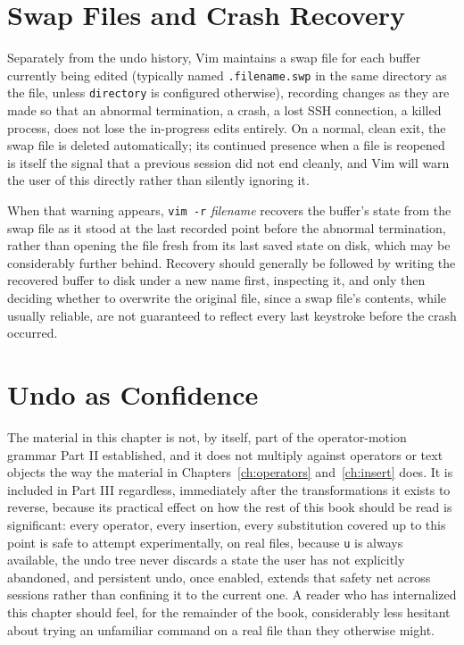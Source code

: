 \section{Swap Files and Crash Recovery}

Separately from the undo history, Vim maintains a swap file for each buffer currently being edited (typically named \texttt{.filename.swp} in the same directory as the file, unless \texttt{directory} is configured otherwise), recording changes as they are made so that an abnormal termination, a crash, a lost SSH connection, a killed process, does not lose the in-progress edits entirely. On a normal, clean exit, the swap file is deleted automatically; its continued presence when a file is reopened is itself the signal that a previous session did not end cleanly, and Vim will warn the user of this directly rather than silently ignoring it.

When that warning appears, \texttt{vim -r} \textit{filename} recovers the buffer's state from the swap file as it stood at the last recorded point before the abnormal termination, rather than opening the file fresh from its last saved state on disk, which may be considerably further behind. Recovery should generally be followed by writing the recovered buffer to disk under a new name first, inspecting it, and only then deciding whether to overwrite the original file, since a swap file's contents, while usually reliable, are not guaranteed to reflect every last keystroke before the crash occurred.

\section{Undo as Confidence}

The material in this chapter is not, by itself, part of the operator-motion grammar Part II established, and it does not multiply against operators or text objects the way the material in Chapters~\ref{ch:operators} and~\ref{ch:insert} does. It is included in Part III regardless, immediately after the transformations it exists to reverse, because its practical effect on how the rest of this book should be read is significant: every operator, every insertion, every substitution covered up to this point is safe to attempt experimentally, on real files, because \texttt{u} is always available, the undo tree never discards a state the user has not explicitly abandoned, and persistent undo, once enabled, extends that safety net across sessions rather than confining it to the current one. A reader who has internalized this chapter should feel, for the remainder of the book, considerably less hesitant about trying an unfamiliar command on a real file than they otherwise might.
